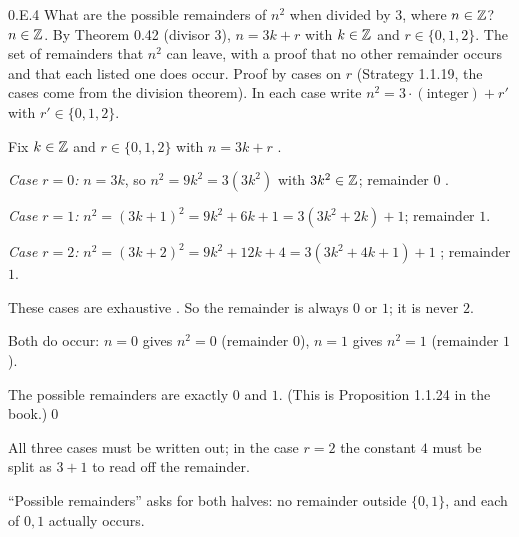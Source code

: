 \begin{bookex}[essential]{0.E.4}
What are the possible remainders of $n^2$ when divided by $3$, where $n\in\mathbb{Z}$?
\solution
\given $n\in\mathbb{Z}$. By Theorem 0.42 (divisor $3$), $n=3k+r$ with $k\in\mathbb{Z}$ and $r\in\{0,1,2\}$.
\goal The set of remainders that $n^2$ can leave, with a proof that no other remainder occurs and that each listed one does occur.
\plan Proof by cases on $r$ (Strategy 1.1.19, the cases come from the division theorem). In each case write $n^2=3\cdot(\text{integer})+r'$ with $r'\in\{0,1,2\}$.
\begin{steps}
\item Fix $k\in\mathbb{Z}$ and $r\in\{0,1,2\}$ with $n=3k+r$ .
\item \emph{Case $r=0$:} $n=3k$, so $n^2=9k^2=3(3k^2)$ with $3k^2\in\mathbb{Z}$; remainder $0$ .
\item \emph{Case $r=1$:} $n^2=(3k+1)^2=9k^2+6k+1=3(3k^2+2k)+1$; remainder $1$.
\item \emph{Case $r=2$:} $n^2=(3k+2)^2=9k^2+12k+4=3(3k^2+4k+1)+1$ ; remainder $1$.
\item These cases are exhaustive . So the remainder is always $0$ or $1$; it is never $2$.
\item Both do occur: $n=0$ gives $n^2=0$ (remainder $0$), $n=1$ gives $n^2=1$ (remainder $1$).
\end{steps}
\answer The possible remainders are exactly $0$ and $1$. (This is Proposition 1.1.24 in the book.)\qed
\begin{compare}
\item All three cases must be written out; in the case $r=2$ the constant $4$ must be split as $3+1$ to read off the remainder.
\item ``Possible remainders'' asks for both halves: no remainder outside $\{0,1\}$, and each of $0,1$ actually occurs.
\end{compare}
\end{bookex}

